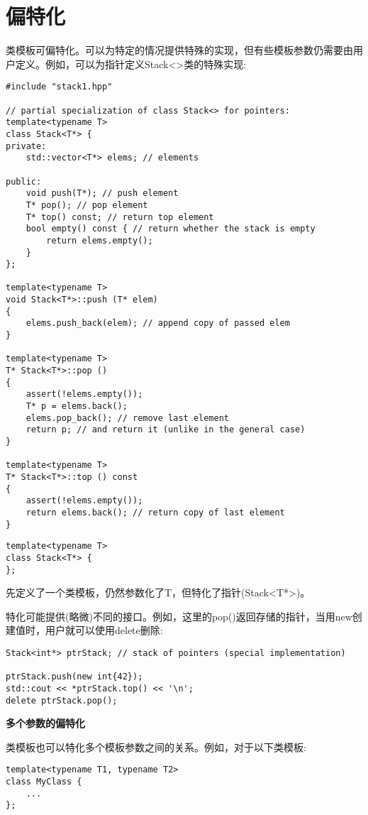 \section{偏特化}

类模板可偏特化。可以为特定的情况提供特殊的实现，但有些模板参数仍需要由用户定义。例如，可以为指针定义Stack<>类的特殊实现:

\begin{lstlisting}[style=styleCXX]
#include "stack1.hpp"

// partial specialization of class Stack<> for pointers:
template<typename T>
class Stack<T*> {
private:
	std::vector<T*> elems; // elements
	
public:
	void push(T*); // push element
	T* pop(); // pop element
	T* top() const; // return top element
	bool empty() const { // return whether the stack is empty
		return elems.empty();
	}
};

template<typename T>
void Stack<T*>::push (T* elem)
{
	elems.push_back(elem); // append copy of passed elem
}

template<typename T>
T* Stack<T*>::pop ()
{
	assert(!elems.empty());
	T* p = elems.back();
	elems.pop_back(); // remove last element
	return p; // and return it (unlike in the general case)
}

template<typename T>
T* Stack<T*>::top () const
{
	assert(!elems.empty());
	return elems.back(); // return copy of last element
}
\end{lstlisting}

\begin{lstlisting}[style=styleCXX]
template<typename T>
class Stack<T*> {
};
\end{lstlisting}

先定义了一个类模板，仍然参数化了T，但特化了指针(Stack<T*>)。

特化可能提供(略微)不同的接口。例如，这里的pop()返回存储的指针，当用new创建值时，用户就可以使用delete删除:

\begin{lstlisting}[style=styleCXX]
Stack<int*> ptrStack; // stack of pointers (special implementation)

ptrStack.push(new int{42});
std::cout << *ptrStack.top() << '\n';
delete ptrStack.pop();
\end{lstlisting}

\noindent
\textbf{多个参数的偏特化}

类模板也可以特化多个模板参数之间的关系。例如，对于以下类模板:

\begin{lstlisting}[style=styleCXX]
template<typename T1, typename T2>
class MyClass {
	...
};
\end{lstlisting}

